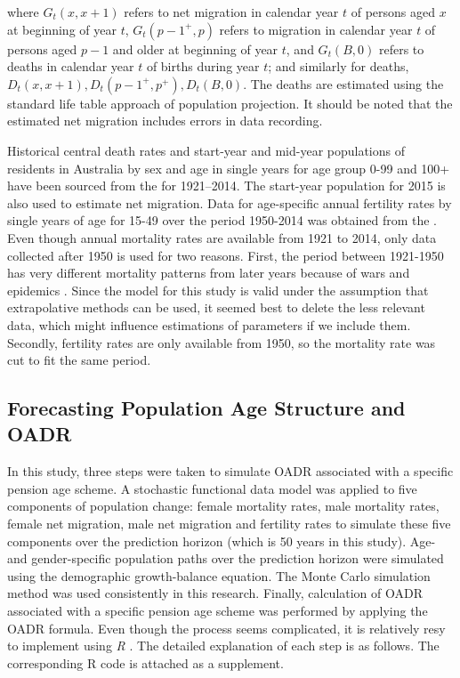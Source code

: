 \documentclass[11pt,a4paper,]{article}
\begin{document}
where \(G_t(x,x+1)\) refers to net migration in calendar year \(t\) of
persons aged \(x\) at beginning of year \(t\), \(G_t(p-1^+,p)\)
 refers to migration in calendar year \(t\) of
persons aged \(p-1\) and older at beginning of year \(t\), and
\(G_t(B,0)\) refers to deaths in calendar year \(t\) of births during
year \(t\); and similarly for deaths,
\(D_t(x,x+1), D_t(p-1^+,p^+), D_t(B,0)\). The deaths are estimated using
the standard life table approach of population projection. It should be
noted that the estimated net migration includes errors in data
recording.

Historical central death rates and start-year and mid-year populations
of residents in Australia by sex and age in single years for age group
0-99 and 100+ have been sourced from the \textcite{HMD} for
1921--2014. The start-year
population for 2015 is also used to estimate net migration. Data for
age-specific annual fertility rates by single years of age for 15-49
over the period 1950-2014 was obtained from the \textcite{ABS12}. Even
though annual mortality rates are available from 1921 to 2014, only data
collected after 1950 is used for two reasons. First, the period between
1921-1950 has very different mortality patterns from later years because
of wars and epidemics \autocite{HB08}. Since the model for this study is
valid under the assumption that extrapolative methods can be used, it
seemed best to delete the less relevant data, which might influence
estimations of parameters if we include them. Secondly, fertility rates
are only available from 1950, so the mortality rate was cut to fit the
same period.

\subsection{Forecasting Population Age Structure and
OADR}\label{sec:forecasting}

In this study, three steps were taken to simulate OADR associated with a
specific pension age scheme. A stochastic functional data model was
applied to five components of population change: female mortality rates,
male mortality rates, female net migration, male net migration and
fertility rates to simulate these five components over the prediction
horizon (which is 50 years in this study). Age- and gender-specific
population paths over the prediction horizon were simulated using the
demographic growth-balance equation. The Monte Carlo simulation method
was used consistently in this research. Finally, calculation of OADR
associated with a specific pension age scheme was performed by applying
the OADR formula. Even though the process seems complicated, it is
relatively resy to implement using \textit{R} \autocite{Team18}. The
detailed explanation of each step is as follows. The corresponding R
code is attached as a supplement.
\end{document}
